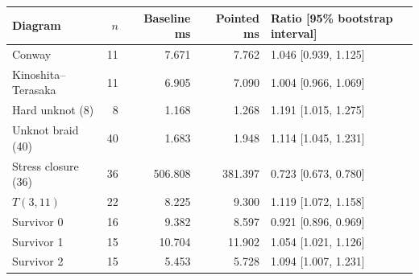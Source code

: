 \begin{tabular}{lrrrl}
\toprule
Diagram & $n$ & Baseline ms & Pointed ms & Ratio [95\% bootstrap interval] \\
\midrule
Conway & 11 & 7.671 & 7.762 & 1.046 [0.939, 1.125] \\
Kinoshita--Terasaka & 11 & 6.905 & 7.090 & 1.004 [0.966, 1.069] \\
Hard unknot (8) & 8 & 1.168 & 1.268 & 1.191 [1.015, 1.275] \\
Unknot braid (40) & 40 & 1.683 & 1.948 & 1.114 [1.045, 1.231] \\
Stress closure (36) & 36 & 506.808 & 381.397 & 0.723 [0.673, 0.780] \\
$T(3,11)$ & 22 & 8.225 & 9.300 & 1.119 [1.072, 1.158] \\
Survivor 0 & 16 & 9.382 & 8.597 & 0.921 [0.896, 0.969] \\
Survivor 1 & 15 & 10.704 & 11.902 & 1.054 [1.021, 1.126] \\
Survivor 2 & 15 & 5.453 & 5.728 & 1.094 [1.007, 1.231] \\
\bottomrule
\end{tabular}
